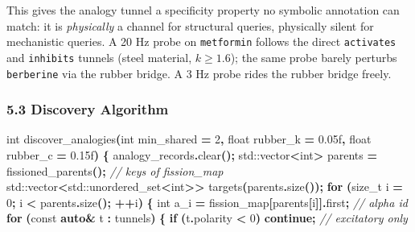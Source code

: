 \documentclass[
  11pt,
  a4paper,
]{article}
\newenvironment{Shaded}{\begin{snugshade}}{\end{snugshade}}
\newcommand{\AttributeTok}[1]{\textcolor[rgb]{0.13,0.29,0.53}{#1}}
\newcommand{\BuiltInTok}[1]{#1}
\newcommand{\CommentTok}[1]{\textcolor[rgb]{0.56,0.35,0.01}{\textit{#1}}}
\newcommand{\ControlFlowTok}[1]{\textcolor[rgb]{0.13,0.29,0.53}{\textbf{#1}}}
\newcommand{\DataTypeTok}[1]{\textcolor[rgb]{0.13,0.29,0.53}{#1}}
\newcommand{\DecValTok}[1]{\textcolor[rgb]{0.00,0.00,0.81}{#1}}
\newcommand{\FloatTok}[1]{\textcolor[rgb]{0.00,0.00,0.81}{#1}}
\newcommand{\KeywordTok}[1]{\textcolor[rgb]{0.13,0.29,0.53}{\textbf{#1}}}
\newcommand{\NormalTok}[1]{#1}
\newcommand{\OperatorTok}[1]{\textcolor[rgb]{0.81,0.36,0.00}{\textbf{#1}}}
\begin{document}
This gives the analogy tunnel a specificity property no symbolic
annotation can match: it is \emph{physically} a channel for structural
queries, physically silent for mechanistic queries. A 20 Hz probe on
\texttt{metformin} follows the direct \texttt{activates} and
\texttt{inhibits} tunnels (steel material, \(k \geq 1.6\)); the same
probe barely perturbs \texttt{berberine} via the rubber bridge. A 3 Hz
probe rides the rubber bridge freely.

\subsubsection{5.3 Discovery Algorithm}\label{discovery-algorithm}

\begin{Shaded}
\begin{Highlighting}[]
\DataTypeTok{int}\NormalTok{ discover\_analogies}\OperatorTok{(}\DataTypeTok{int}\NormalTok{ min\_shared }\OperatorTok{=} \DecValTok{2}\OperatorTok{,}
                       \DataTypeTok{float}\NormalTok{ rubber\_k }\OperatorTok{=} \FloatTok{0.05}\BuiltInTok{f}\OperatorTok{,} \DataTypeTok{float}\NormalTok{ rubber\_c }\OperatorTok{=} \FloatTok{0.15}\BuiltInTok{f}\OperatorTok{)}
\OperatorTok{\{}
\NormalTok{    analogy\_records}\OperatorTok{.}\NormalTok{clear}\OperatorTok{();}
    \BuiltInTok{std::}\NormalTok{vector}\OperatorTok{\textless{}}\DataTypeTok{int}\OperatorTok{\textgreater{}}\NormalTok{ parents }\OperatorTok{=}\NormalTok{ fissioned\_parents}\OperatorTok{();}     \CommentTok{// keys of fission\_map}
    \BuiltInTok{std::}\NormalTok{vector}\OperatorTok{\textless{}}\BuiltInTok{std::}\NormalTok{unordered\_set}\OperatorTok{\textless{}}\DataTypeTok{int}\OperatorTok{\textgreater{}\textgreater{}}\NormalTok{ targets}\OperatorTok{(}\NormalTok{parents}\OperatorTok{.}\NormalTok{size}\OperatorTok{());}
    \ControlFlowTok{for} \OperatorTok{(}\DataTypeTok{size\_t}\NormalTok{ i }\OperatorTok{=} \DecValTok{0}\OperatorTok{;}\NormalTok{ i }\OperatorTok{\textless{}}\NormalTok{ parents}\OperatorTok{.}\NormalTok{size}\OperatorTok{();} \OperatorTok{++}\NormalTok{i}\OperatorTok{)} \OperatorTok{\{}
        \DataTypeTok{int}\NormalTok{ a\_i }\OperatorTok{=}\NormalTok{ fission\_map}\OperatorTok{[}\NormalTok{parents}\OperatorTok{[}\NormalTok{i}\OperatorTok{]].}\NormalTok{first}\OperatorTok{;}        \CommentTok{// alpha id}
        \ControlFlowTok{for} \OperatorTok{(}\AttributeTok{const} \KeywordTok{auto}\OperatorTok{\&}\NormalTok{ t }\OperatorTok{:}\NormalTok{ tunnels}\OperatorTok{)} \OperatorTok{\{}
            \ControlFlowTok{if} \OperatorTok{(}\NormalTok{t}\OperatorTok{.}\NormalTok{polarity }\OperatorTok{\textless{}} \DecValTok{0}\OperatorTok{)} \ControlFlowTok{continue}\OperatorTok{;}               \CommentTok{// excitatory only}

\end{Highlighting}
\end{Shaded}
\end{document}
